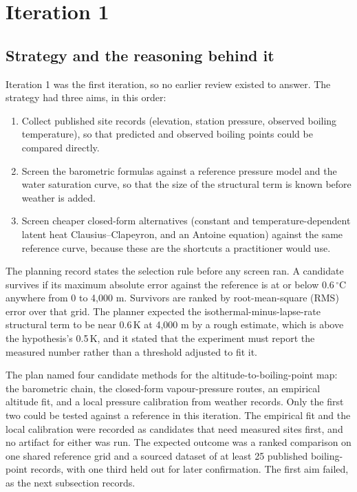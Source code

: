 \documentclass[11pt,letterpaper]{article}
\begin{document}
\section{Iteration 1}

\subsection{Strategy and the reasoning behind it}

Iteration 1 was the first iteration, so no earlier review existed to answer. The strategy had three aims, in this order:
\begin{enumerate}
\item Collect published site records (elevation, station pressure, observed boiling temperature), so that predicted and observed boiling points could be compared directly.
\item Screen the barometric formulas against a reference pressure model and the water saturation curve, so that the size of the structural term is known before weather is added.
\item Screen cheaper closed-form alternatives (constant and temperature-dependent latent heat Clausius--Clapeyron, and an Antoine equation) against the same reference curve, because these are the shortcuts a practitioner would use.
\end{enumerate}

The planning record states the selection rule before any screen ran. A candidate survives if its maximum absolute error against the reference is at or below 0.6\,$^\circ$C anywhere from 0 to 4,000 m. Survivors are ranked by root-mean-square (RMS) error over that grid. The planner expected the isothermal-minus-lapse-rate structural term to be near 0.6\,K at 4,000 m by a rough estimate, which is above the hypothesis's 0.5\,K, and it stated that the experiment must report the measured number rather than a threshold adjusted to fit it.

The plan named four candidate methods for the altitude-to-boiling-point map: the barometric chain, the closed-form vapour-pressure routes, an empirical altitude fit, and a local pressure calibration from weather records. Only the first two could be tested against a reference in this iteration. The empirical fit and the local calibration were recorded as candidates that need measured sites first, and no artifact for either was run. The expected outcome was a ranked comparison on one shared reference grid and a sourced dataset of at least 25 published boiling-point records, with one third held out for later confirmation. The first aim failed, as the next subsection records.
\end{document}
